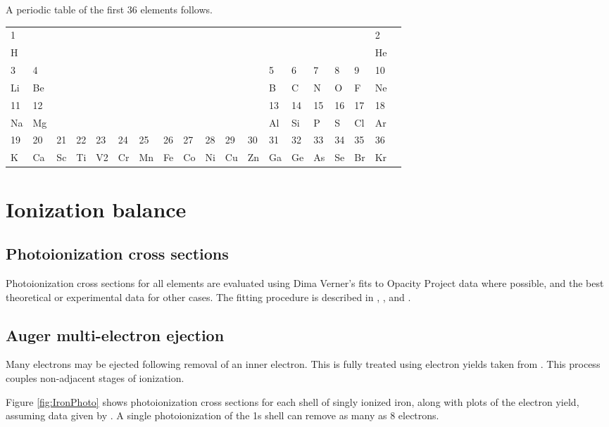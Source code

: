 A periodic table of the first 36 elements follows.

\begin{center}
\begin{tabular}{lllllllllllllllllll}
\hline
1&&&&&&&&&&&&&&&&&2\\
H&&&&&&&&&&&&&&&&&He\\
3&4&&&&&&&&&&&5&6&7&8&9&10\\
Li&Be&&&&&&&&&&&B&C&N&O&F&Ne\\
11&12&&&&&&&&&&&13&14&15&16&17&18\\
Na&Mg&&&&&&&&&&&Al&Si&P&S&Cl&Ar\\
19&20&21&22&23&24&25&26&27&28&29&30&31&32&33&34&35&36\\
K&Ca&Sc&Ti&V2&Cr&Mn&Fe&Co&Ni&Cu&Zn&Ga&Ge&As&Se&Br&Kr\\
\hline
\end{tabular}
\end{center}

\section{Ionization balance}

\subsection{Photoionization cross sections}

Photoionization cross sections for all elements are evaluated using Dima
Verner's fits to Opacity Project data where possible, and the best
theoretical or experimental data for other cases.
The fitting procedure
is described in \citet{Verner1993}, \citet{Verner1995},
and \citet{VernerFerlandKorista1996}.

\subsection{Auger multi-electron ejection}

Many electrons may be ejected following removal of an inner electron.
This is fully treated using electron yields taken from
\citet{Kaastra1993}.
This process couples non-adjacent stages of ionization.

Figure \ref{fig:IronPhoto} shows photoionization cross sections for each shell of singly
ionized iron, along with plots of the electron yield, assuming data given
by \citet{Kaastra1993}.  A single photoionization of the 1s shell can
remove as many as 8 electrons.


